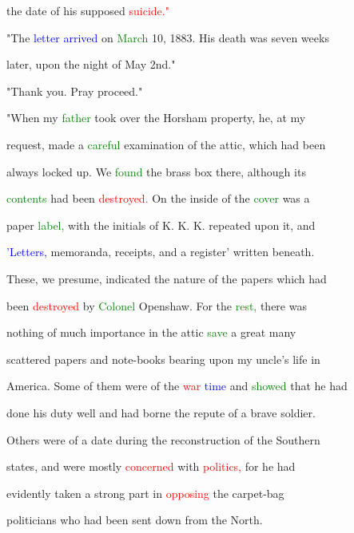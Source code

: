  the date of his supposed \textcolor{red}{suicide."}



 "The \textcolor{blue}{letter} \textcolor{blue}{arrived} on \textcolor{green}{March} 10, 1883. His \textcolor{BurntOrange}{death} was seven weeks

 later, upon the night of May 2nd."



 "Thank you. \textcolor{BurntOrange}{Pray} proceed."



 "When my \textcolor{green}{father} took over the Horsham property, he, at my

 request, made a \textcolor{green}{careful} \textcolor{BurntOrange}{examination} of the attic, which had been

 always locked up. We \textcolor{green}{found} the brass box there, although its

 \textcolor{green}{contents} had been \textcolor{red}{destroyed.} On the inside of the \textcolor{green}{cover} was a

 paper \textcolor{green}{label,} with the initials of K. K. K. repeated upon it, and

 \textcolor{blue}{'Letters,} memoranda, receipts, and a register' written beneath.

 These, we presume, indicated the nature of the papers which had

 been \textcolor{red}{destroyed} by \textcolor{green}{Colonel} Openshaw. For the \textcolor{green}{rest,} there was

 nothing of much \textcolor{BurntOrange}{importance} in the attic \textcolor{green}{save} a great many

 scattered papers and note-books bearing upon my uncle's life in

 America. Some of them were of the \textcolor{red}{war} \textcolor{blue}{time} and \textcolor{green}{showed} that he had

 done his duty well and had borne the repute of a brave \textcolor{BurntOrange}{soldier.}

 Others were of a date during the \textcolor{BurntOrange}{reconstruction} of the Southern

 states, and were mostly \textcolor{red}{concerned} with \textcolor{red}{politics,} for he had

 evidently taken a strong part in \textcolor{red}{opposing} the carpet-bag

 politicians who had been sent down from the North.




